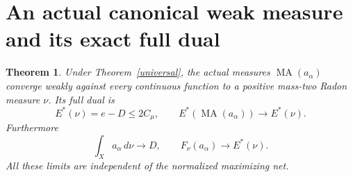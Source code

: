 \documentclass[11pt]{article}
\newtheorem{theorem}{Theorem}
\newcommand{\MA}{\operatorname{MA}}
\begin{document}
\section{An actual canonical weak measure and its exact full dual}
\begin{theorem}\label{measure}
Under Theorem~\ref{universal}, the actual measures
$\MA(a_\alpha)$ converge weakly against every continuous function
to a positive mass-two Radon measure $\nu$. Its full dual is
\begin{equation}\label{dualnu}
 E^*(\nu)=e-D\le2C_\mu,
 \qquad E^*(\MA(a_\alpha))\longrightarrow E^*(\nu).
\end{equation}
Furthermore
\begin{equation}\label{calibration}
 \int_Xa_\alpha\,d\nu\to D,
 \qquad F_\nu(a_\alpha)\to E^*(\nu).
\end{equation}
All these limits are independent of the normalized maximizing net.
\end{theorem}
\end{document}
